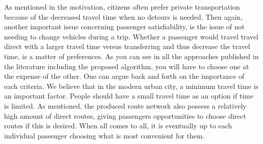 As mentioned in the motivation, citizens often prefer private transportation because of the decreased travel time when no detours is needed. Then again, another important issue concerning passenger satisfiability, is the issue of not needing to change vehicles during a trip. Whether a passenger would travel travel direct with a larger travel time versus transferring and thus decrease the travel time, is a matter of preferences. As you can see in all the approaches published in the literature including the proposed algorithm, you will have to choose one at the expense of the other. One can argue back and forth on the importance of each criteria. We believe that in the modern urban city, a minimum travel time is an important factor. People should have a small travel time as an option if time is limited. As mentioned, the produced route network also possess a relatively high amount of direct routes, giving passengers opportunities to choose direct routes if this is desired. %
When all comes to all, it is eventually up to each individual passenger choosing what is most convenient for them. 
